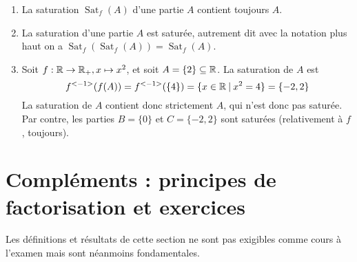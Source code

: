 \begin{exemple}
\begin{enumerate}
\item La saturation $\operatorname{Sat}_f(A)$ d'une partie $A$ contient toujours $A$.
\item La saturation d'une partie $A$ est saturée, autrement dit avec la notation plus haut  on a  $\operatorname{Sat}_f(\operatorname{Sat}_f(A)) = \operatorname{Sat}_f(A)$.
\item Soit $f : \mathbb{R}\to \mathbb{R}_+, x\mapsto x^2$, et soit $A=\{2\} \subseteq \mathbb{R}$. La saturation de $A$ est 
\[f^{<-1>}(f(A)) = f^{<-1>}(\{4\}) = \{x\in \mathbb{R}\:|\: x^2=4\} = \{-2,2\}
\]
La saturation de $A$ contient donc strictement $A$, qui n'est donc pas saturée. Par contre, les parties $B = \{0\}$ et $C=\{-2,2\}$ sont saturées (relativement à $f$, toujours).
\end{enumerate}
\end{exemple}


\section{Compléments : principes de factorisation et exercices}

Les définitions et résultats de cette section ne sont pas exigibles comme cours à l'examen mais sont néanmoins fondamentales.




